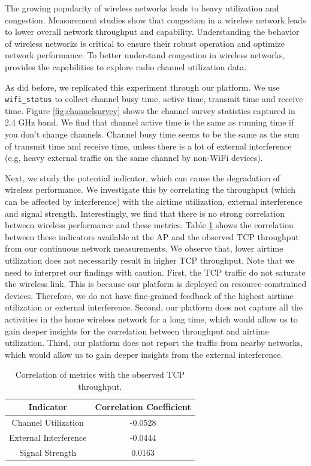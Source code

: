 The growing popularity of wireless networks leads to heavy utilization and congestion. Measurement studies show that congestion in a wireless network leads to lower overall network throughput and capability. Understanding the behavior of wireless networks is critical to ensure their robust operation and optimize network performance. To better understand congestion in wireless networks, \sysname provides the capabilities to explore radio channel utilization data.

As \cite{channelsurvey} did before, we replicated this experiment through our \sysname platform. We use \texttt{wifi\_status} to collect channel busy time, active time, transmit time and receive time. Figure \ref{fig:channelsurvey} shows the channel survey statistics captured in 2.4 GHz band. We find that channel active time is the same as running time if you don't change channels. Channel busy time seems to be the same as the sum of transmit time and receive time, unless there is a lot of external interference (e.g, heavy external traffic on the same channel by non-WiFi devices).

Next, we study the potential indicator, which can cause the degradation of wireless performance. We investigate this by correlating the throughput (which can be affected by interference) with the airtime utilization, external interference and signal strength. Interestingly, we find that there is no strong correlation between wireless performance and these metrics. Table \ref{table: Correlation} shows the correlation between these indicators available at the AP and the observed TCP throughput from our continuous network measurements. We observe that, lower airtime utilization does not necessarily result in higher TCP throughput. Note that we need to interpret our findings with caution. First, the TCP traffic do not saturate the wireless link. This is because our platform is deployed on resource-constrained devices. Therefore, we do not have fine-grained feedback of the highest airtime utilization or external interference. Second, our platform does not capture all the activities in the home wireless network for a long time, which would allow us to gain deeper insights for the correlation between throughput and airtime utilization. Third, our platform does not report the traffic from nearby networks, which would allow us to gain deeper insights from the external interference.

\begin{table}[]
\centering
\begin{tabular}{ |c|c| }
\hline
Indicator               & Correlation Coefficient  \\
\hline
Channel Utilization               &-0.0528  \\
\hline
External Interference & -0.0444 \\
\hline
Signal Strength & 0.0163 \\
\hline
\end{tabular}
\caption{Correlation of metrics with the observed TCP throughput.}
\label{table: Correlation}
\end{table}

